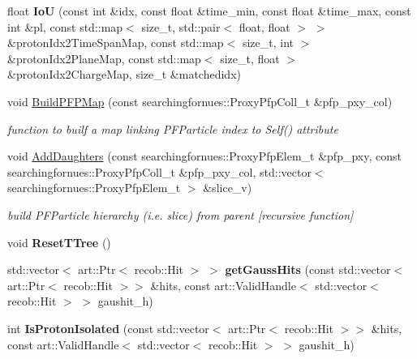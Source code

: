 \begin{DoxyCompactItemize}
\item 
float {\bfseries IoU} (const int \&idx, const float \&time\+\_\+min, const float \&time\+\_\+max, const int \&pl, const std\+::map$<$ size\+\_\+t, std\+::pair$<$ float, float $>$ $>$ \&proton\+Idx2\+Time\+Span\+Map, const std\+::map$<$ size\+\_\+t, int $>$ \&proton\+Idx2\+Plane\+Map, const std\+::map$<$ size\+\_\+t, float $>$ \&proton\+Idx2\+Charge\+Map, size\+\_\+t \&matchedidx)\hypertarget{classProtonTruthStudies_a0ab41a24c0fd5197a24dffecd076655c}{}\label{classProtonTruthStudies_a0ab41a24c0fd5197a24dffecd076655c}

\item 
void \hyperlink{classProtonTruthStudies_a7e04fe8bb75084fa9592aa7c3a0bd985}{Build\+P\+F\+P\+Map} (const searchingfornues\+::\+Proxy\+Pfp\+Coll\+\_\+t \&pfp\+\_\+pxy\+\_\+col)
\begin{DoxyCompactList}\small\item\em function to builf a map linking P\+F\+Particle index to Self() attribute \end{DoxyCompactList}\item 
void \hyperlink{classProtonTruthStudies_adf98811f4b6fd85f8c72684a848ece17}{Add\+Daughters} (const searchingfornues\+::\+Proxy\+Pfp\+Elem\+\_\+t \&pfp\+\_\+pxy, const searchingfornues\+::\+Proxy\+Pfp\+Coll\+\_\+t \&pfp\+\_\+pxy\+\_\+col, std\+::vector$<$ searchingfornues\+::\+Proxy\+Pfp\+Elem\+\_\+t $>$ \&slice\+\_\+v)
\begin{DoxyCompactList}\small\item\em build P\+F\+Particle hierarchy (i.\+e. slice) from parent \mbox{[}recursive function\mbox{]} \end{DoxyCompactList}\item 
void {\bfseries Reset\+T\+Tree} ()\hypertarget{classProtonTruthStudies_adc6be889a86ce1ef0e01f46b45c6af03}{}\label{classProtonTruthStudies_adc6be889a86ce1ef0e01f46b45c6af03}

\item 
std\+::vector$<$ art\+::\+Ptr$<$ recob\+::\+Hit $>$ $>$ {\bfseries get\+Gauss\+Hits} (const std\+::vector$<$ art\+::\+Ptr$<$ recob\+::\+Hit $>$$>$ \&hits, const art\+::\+Valid\+Handle$<$ std\+::vector$<$ recob\+::\+Hit $>$ $>$ gaushit\+\_\+h)\hypertarget{classProtonTruthStudies_a0bb496d9505f3937142e504b0c30f902}{}\label{classProtonTruthStudies_a0bb496d9505f3937142e504b0c30f902}

\item 
int {\bfseries Is\+Proton\+Isolated} (const std\+::vector$<$ art\+::\+Ptr$<$ recob\+::\+Hit $>$$>$ \&hits, const art\+::\+Valid\+Handle$<$ std\+::vector$<$ recob\+::\+Hit $>$ $>$ gaushit\+\_\+h)\hypertarget{classProtonTruthStudies_a52222968a8c233bcde690d71c51b0f1e}{}\label{classProtonTruthStudies_a52222968a8c233bcde690d71c51b0f1e}


\end{DoxyCompactItemize}
